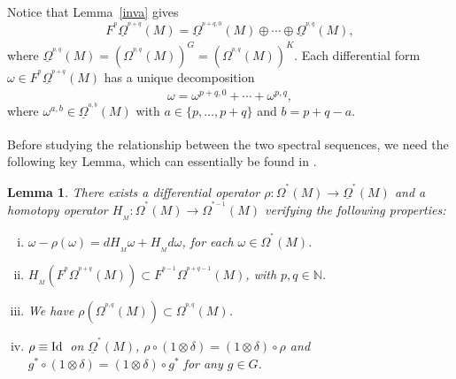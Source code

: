 \documentclass[a4paper,oneside,10pt,reqno]{amsart}
\newtheorem{lemma}[theorem]{Lemma}
\theoremstyle{definition}
\newcommand{\lemref}[1]{Lemma~\ref{#1}}
\newcommand\negro{\normalcolor}
\newcommand{\Ide}{\mathop{\rm Id \, } \nolimits}
\newcommand\Om{\Omega}
\newcommand\BOm{\underline\Omega}
\newcommand\om{\omega}
\newcommand\N{\mathbb N}
\newcommand{\bi}[2]{{#1}^{^{#2}}}
\newcommand{\ib}[2]{{#1}_{_{#2}}}
\newcommand{\lau}[4]{{#1}^{^{#2}}_{_{#3}}{\left( #4 \right)}}
\newcommand{\coho}[3]{{#1}^{^{#2}}{\left( #3 \right)}}
\begin{document}
Notice that \lemref{inva} gives
$$
\bi{F}{p}\lau{\BOm}{p+q}{}{M}  = \coho \BOm{p+q,0} M  \oplus \cdots \oplus \coho \BOm{p,q} M ,
$$
where $\lau \BOm{p,q} {} M = \left( \lau \Om{p,q} {}M\right)^G = \left( \lau \Om{p,q} {}M\right)^K$.
Each differential form $\omega \in \bi{F}{p}\lau{\BOm}{p+q}{}{M}$ has a unique decomposition
\begin{equation}\label{decomp}
\omega = \omega^{p+q,0} + \cdots + \om^{p,q},
\end{equation}
where $\om^{a,b} \in  \lau \BOm{a,b} {} M $ with $a\in \{p, \ldots , p+q\}$ and $b =p+q-a$.

\smallskip

Before studying the relationship between the two spectral sequences, we need the following key Lemma, which can essentially be found in \cite[Chap. 4, Sec.1, Theorem I]{MR0336651}.

\begin{lemma}\label{61} 
There exists a differential operator
$\rho \colon \coho \Om * M \to  \coho \BOm * M $ and a homotopy operator \negro
$ \ib{H}{M}   \colon \coho \Om * M \to \coho \Om {*-1} M$ verifying the following properties:
\begin{enumerate}[i)]
\item $\om -\rho(\om) = d \ib{H}{M}  \om+ \ib{H}{M}  d\om$, for each $\om \in \coho \Om * M$.
\item    $ \ib{H}{M}  (\bi{F}{p} \lau{\Om}{p+q}{}{M} ) \subset \bi{F}{p-1} \lau{\Om}{p+q-1}{}{M}$, with $p,q\in \N$.

\item We have $\rho \left(\lau{\Om}{p,q}{}{M}  \right) \subset   \lau{\Om}{p,q}{}{M}  $.

\item   $\rho \equiv \Ide$ on $\coho \BOm * M$, $\rho \circ (1\otimes \delta) = (1\otimes \delta) \circ \rho$ and 
$g^* \circ (1\otimes \delta) = (1\otimes \delta) \circ g^*$ for any $g \in G$.
\end{enumerate}
\end{lemma}
\end{document}
